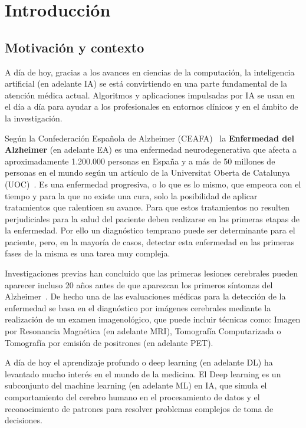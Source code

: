 \chapter{Introducción}\label{ch:introduccion}


\section{Motivación y contexto}\label{sec:motivacion-y-contexto}
A día de hoy, gracias a los avances en ciencias de la computación, la inteligencia artificial (en adelante IA) se está
convirtiendo en una parte fundamental de la atención médica actual.
Algoritmos y aplicaciones impulsadas por IA se usan en el día a día para ayudar a los profesionales en entornos clínicos
y en el ámbito de la investigación.

Según la Confederación Española de Alzheimer (CEAFA)~\cite{ceafa} la \textbf{Enfermedad del Alzheimer} (en adelante EA)
es una enfermedad neurodegenerativa que afecta a aproximadamente 1.200.000 personas en España y a más de 50 millones de
personas en el mundo según un artículo de la Universitat Oberta de Catalunya (UOC)~\cite{uoc}.
Es una enfermedad progresiva, o lo que es lo mismo, que empeora con el tiempo y para la que no existe una cura, solo
la posibilidad de aplicar tratamientos que ralenticen su avance.
Para que estos tratamientos no resulten perjudiciales para la salud del paciente deben realizarse en las primeras etapas
de la enfermedad.
Por ello un diagnóstico temprano puede ser determinante para el paciente, pero, en la mayoría de casos, detectar esta
enfermedad en las primeras fases de la misma es una tarea muy compleja.

Investigaciones previas han concluido que las primeras lesiones cerebrales pueden aparecer incluso 20 años antes de que
aparezcan los primeros síntomas del Alzheimer~\cite{ceafa}.
De hecho una de las evaluaciones médicas para la detección de la enfermedad se basa en el diagnóstico por imágenes
cerebrales mediante la realización de un examen imagenológico, que puede incluir técnicas como: Imagen por Resonancia
Magnética (en adelante MRI), Tomografía Computarizada o Tomografía por emisión de positrones (en adelante PET).

A día de hoy el aprendizaje profundo o deep learning (en adelante DL)  ha levantado mucho interés en el mundo de la
medicina.
El Deep learning es un subconjunto del machine learning (en adelante ML) en IA, que simula el comportamiento del cerebro
humano en el procesamiento de datos y el reconocimiento de patrones para resolver problemas complejos de toma de
decisiones.

